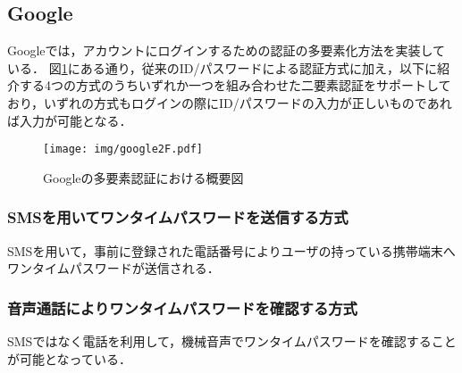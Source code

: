 \subsection{Google}\label{subsec:google2F}
Googleでは，アカウントにログインするための認証の多要素化方法を実装している．
図\ref{fig:google2F}にある通り，従来のID/パスワードによる認証方式に加え，以下に紹介する4つの方式のうちいずれか一つを組み合わせた二要素認証をサポートしており，いずれの方式もログインの際にID/パスワードの入力が正しいものであれば入力が可能となる．

\begin{figure}[ht]
  \begin{center}
    \texttt{[image: img/google2F.pdf]}
  \end{center}
  \caption{Googleの多要素認証における概要図}
  \label{fig:google2F}
\end{figure}

\subsubsection{SMSを用いてワンタイムパスワードを送信する方式}
SMSを用いて，事前に登録された電話番号によりユーザの持っている携帯端末へワンタイムパスワードが送信される．

\subsubsection{音声通話によりワンタイムパスワードを確認する方式}
SMSではなく電話を利用して，機械音声でワンタイムパスワードを確認することが可能となっている．

